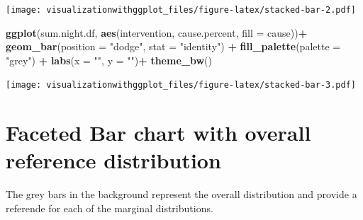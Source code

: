 \documentclass[]{krantz}
\makeatletter
\newenvironment{Shaded}{\begin{snugshade}}{\end{snugshade}}
\newcommand{\DataTypeTok}[1]{\textcolor[rgb]{0.13,0.29,0.53}{#1}}
\newcommand{\DecValTok}[1]{\textcolor[rgb]{0.00,0.00,0.81}{#1}}
\newcommand{\FloatTok}[1]{\textcolor[rgb]{0.00,0.00,0.81}{#1}}
\newcommand{\KeywordTok}[1]{\textcolor[rgb]{0.13,0.29,0.53}{\textbf{#1}}}
\newcommand{\NormalTok}[1]{#1}
\newcommand{\OperatorTok}[1]{\textcolor[rgb]{0.81,0.36,0.00}{\textbf{#1}}}
\newcommand{\StringTok}[1]{\textcolor[rgb]{0.31,0.60,0.02}{#1}}
\newenvironment{kframe}{%
\medskip{}
\setlength{\fboxsep}{.8em}
 \def\at@end@of@kframe{}%
 \ifinner\ifhmode%
  \def\at@end@of@kframe{\end{minipage}}%
  \begin{minipage}{\columnwidth}%
 \fi\fi%
 \def\FrameCommand##1{\hskip\@totalleftmargin \hskip-\fboxsep
 \colorbox{shadecolor}{##1}\hskip-\fboxsep
     \hskip-\linewidth \hskip-\@totalleftmargin \hskip\columnwidth}%
 \MakeFramed {\advance\hsize-\width
   \@totalleftmargin\z@ \linewidth\hsize
   \@setminipage}}%
 {\par\unskip\endMakeFramed%
 \at@end@of@kframe}
\renewenvironment{Shaded}{\begin{kframe}}{\end{kframe}}
\makeatother
\begin{document}
\texttt{[image: visualizationwithggplot\_files/figure-latex/stacked-bar-2.pdf]}

\begin{Shaded}
\begin{Highlighting}[]
\KeywordTok{ggplot}\NormalTok{(sum.night.df, }\KeywordTok{aes}\NormalTok{(intervention, cause.percent, }\DataTypeTok{fill =}\NormalTok{ cause))}\OperatorTok{+}
\StringTok{    }\KeywordTok{geom_bar}\NormalTok{(}\DataTypeTok{position =} \StringTok{"dodge"}\NormalTok{, }\DataTypeTok{stat =} \StringTok{"identity"}\NormalTok{) }\OperatorTok{+}
\StringTok{   }\KeywordTok{fill_palette}\NormalTok{(}\DataTypeTok{palette =} \StringTok{"grey"}\NormalTok{) }\OperatorTok{+}
\StringTok{   }\KeywordTok{labs}\NormalTok{(}\DataTypeTok{x =} \StringTok{""}\NormalTok{, }\DataTypeTok{y =} \StringTok{""}\NormalTok{)}\OperatorTok{+}
\StringTok{  }\KeywordTok{theme_bw}\NormalTok{()}
\end{Highlighting}
\end{Shaded}

\texttt{[image: visualizationwithggplot\_files/figure-latex/stacked-bar-3.pdf]}

\hypertarget{faceted-bar-chart-with-overall-reference-distribution}{%
\section{Faceted Bar chart with overall reference distribution}\label{faceted-bar-chart-with-overall-reference-distribution}}

The grey bars in the background represent the overall distribution and provide a referende for each of the marginal distributions.

\begin{Shaded}
\end{Shaded}
\end{document}
